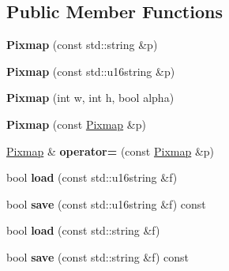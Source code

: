 \subsection*{Public Member Functions}
\begin{DoxyCompactItemize}
\item 
\hypertarget{class_tempest_1_1_pixmap_a2a47a698020acbe0632280e47b6cf551}{{\bfseries Pixmap} (const std\+::string \&p)}\label{class_tempest_1_1_pixmap_a2a47a698020acbe0632280e47b6cf551}

\item 
\hypertarget{class_tempest_1_1_pixmap_a4303f9f7ecd3b16e5c3bd42154b7c447}{{\bfseries Pixmap} (const std\+::u16string \&p)}\label{class_tempest_1_1_pixmap_a4303f9f7ecd3b16e5c3bd42154b7c447}

\item 
\hypertarget{class_tempest_1_1_pixmap_a051cd017b7ff8ea9ba94ffc4dfd4ebe4}{{\bfseries Pixmap} (int w, int h, bool alpha)}\label{class_tempest_1_1_pixmap_a051cd017b7ff8ea9ba94ffc4dfd4ebe4}

\item 
\hypertarget{class_tempest_1_1_pixmap_a7d6d75bff92f9cf763e76641b0ef0568}{{\bfseries Pixmap} (const \hyperlink{class_tempest_1_1_pixmap}{Pixmap} \&p)}\label{class_tempest_1_1_pixmap_a7d6d75bff92f9cf763e76641b0ef0568}

\item 
\hypertarget{class_tempest_1_1_pixmap_a9bafab34da8ac8fa09616865b10cb9d8}{\hyperlink{class_tempest_1_1_pixmap}{Pixmap} \& {\bfseries operator=} (const \hyperlink{class_tempest_1_1_pixmap}{Pixmap} \&p)}\label{class_tempest_1_1_pixmap_a9bafab34da8ac8fa09616865b10cb9d8}

\item 
\hypertarget{class_tempest_1_1_pixmap_a9325328c1062c806e07999485efa10f5}{bool {\bfseries load} (const std\+::u16string \&f)}\label{class_tempest_1_1_pixmap_a9325328c1062c806e07999485efa10f5}

\item 
\hypertarget{class_tempest_1_1_pixmap_ac3ac646769688efb46dff2e3b894bfba}{bool {\bfseries save} (const std\+::u16string \&f) const }\label{class_tempest_1_1_pixmap_ac3ac646769688efb46dff2e3b894bfba}

\item 
\hypertarget{class_tempest_1_1_pixmap_a0313f9d7401122aae5c6b73efc8f317c}{bool {\bfseries load} (const std\+::string \&f)}\label{class_tempest_1_1_pixmap_a0313f9d7401122aae5c6b73efc8f317c}

\item 
\hypertarget{class_tempest_1_1_pixmap_ae2454067ffd2511e74d486c96956146c}{bool {\bfseries save} (const std\+::string \&f) const }\label{class_tempest_1_1_pixmap_ae2454067ffd2511e74d486c96956146c}


\end{DoxyCompactItemize}
